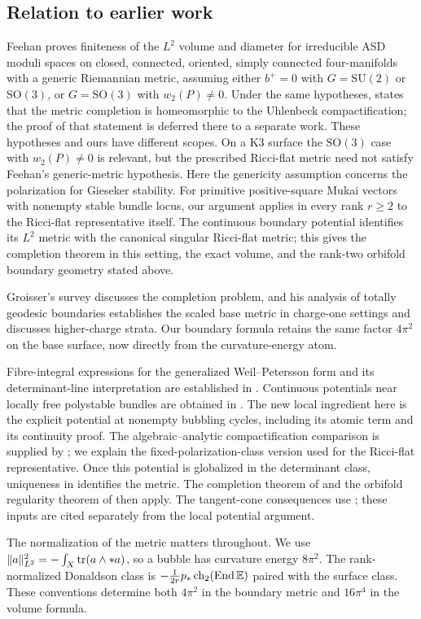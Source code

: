 \subsection{Relation to earlier work}
Feehan \cite[Theorem~1.1]{Fee95} proves finiteness of the $L^2$ volume
and diameter for irreducible ASD moduli spaces on closed, connected,
oriented, simply connected four-manifolds with a generic Riemannian
metric, assuming either $b^+=0$ with $G=\mathrm{SU}(2)$ or
$\mathrm{SO}(3)$, or $G=\mathrm{SO}(3)$ with $w_2(P)\ne0$.
Under the same hypotheses, \cite[Theorem~1.2]{Fee95} states that the
metric completion is homeomorphic to the Uhlenbeck compactification;
the proof of that statement is deferred there to a separate work.
These hypotheses and ours have different scopes. On a K3 surface the
$\mathrm{SO}(3)$ case with $w_2(P)\ne0$ is relevant, but the prescribed
Ricci-flat metric need not satisfy Feehan's generic-metric hypothesis.
Here the genericity assumption concerns the polarization for Gieseker
stability. For primitive positive-square Mukai vectors with nonempty
stable bundle locus, our argument applies in every rank $r\ge2$ to the
Ricci-flat representative itself. The continuous boundary potential
identifies its $L^2$ metric with the canonical singular Ricci-flat metric;
this gives the completion theorem in this setting, the exact volume,
and the rank-two orbifold boundary geometry stated above.

Groisser's survey \cite{Gro97} discusses the completion problem, and his analysis
of totally geodesic boundaries \cite{Gro98} establishes the scaled base
metric in charge-one settings and discusses higher-charge strata.
Our boundary formula retains the same factor
$4\pi^2$ on the base surface, now directly from the curvature-energy atom.

Fibre-integral expressions for the generalized Weil--Petersson form and
its determinant-line interpretation are established in
\cite{ST92,BS16}. Continuous potentials near locally free polystable
bundles are obtained in \cite{BSc20}.
The new local ingredient here is the explicit potential at nonempty
bubbling cycles, including its atomic term and its continuity proof.
The algebraic--analytic compactification comparison is supplied by
\cite{BTT17,GSTW21}; we explain the fixed-polarization-class version used
for the Ricci-flat representative.
Once this potential is globalized in the determinant class, uniqueness
in \cite{EGZ09} identifies the metric. The completion theorem of
\cite{Song14} and the orbifold regularity theorem of \cite{GPP25}
then apply. The tangent-cone consequences use
\cite{NO26,DS17,LWX21}; these inputs are cited separately from the local
potential argument.

The normalization of the metric matters throughout. We use
$\|a\|_{L^2}^2=-\int_X\operatorname{tr}(a\wedge *a)$, so a bubble has curvature
energy $8\pi^2$. The rank-normalized Donaldson class is
$-\frac1{2r}p_*\operatorname{ch}_2(\operatorname{End}\mathbb E)$ paired with the surface class.
These conventions determine both $4\pi^2$ in the boundary metric and
$16\pi^4$ in the volume formula.
